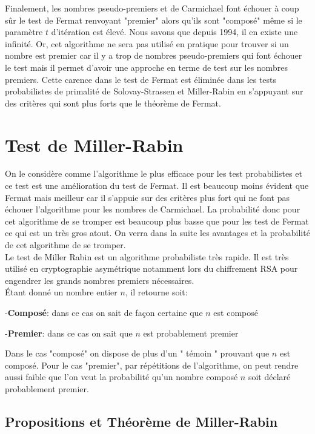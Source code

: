 Finalement, les nombres pseudo-premiers et  de Carmichael font échouer à coup sûr le test de Fermat renvoyant "premier" alors qu'ils sont "composé" même si le paramètre $t$ d'itération est élevé. Nous savons que depuis 1994, il en existe une infinité. Or, cet algorithme ne sera pas utilisé en pratique pour trouver si un nombre est premier car il y a trop de nombres pseudo-premiers qui font échouer le test mais il permet d'avoir une approche en terme de test sur les nombres premiers.
Cette carence dans le test de Fermat est éliminée dans les tests probabilistes de primalité de Solovay-Strassen et Miller-Rabin en s’appuyant sur des critères qui sont plus forts que le théorème de Fermat.


\section{Test de Miller-Rabin}

 On le considère comme l'algorithme le plus efficace pour les test probabilistes et ce test est une amélioration du test de Fermat. Il est beaucoup moins évident que Fermat mais meilleur car il s'appuie sur des critères plus fort qui ne font pas échouer l'algorithme pour les nombres de Carmichael. La probabilité donc pour cet algorithme de se tromper est beaucoup plus basse que pour les test de Fermat ce qui est un très gros atout. On verra dans la suite les avantages et la probabilité de cet algorithme de se tromper.\\
 Le test de Miller Rabin est un algorithme probabiliste très rapide. Il est très utilisé en cryptographie asymétrique notamment lors du chiffrement RSA pour engendrer les grands nombres premiers nécessaires.\\ Étant donné un nombre entier $n$, il retourne soit:

-\textbf{Composé}: dans ce cas on sait de façon certaine que $n$ est composé

-\textbf{Premier}: dans ce cas on sait que $n$ est probablement premier

Dans le cas "composé" on dispose de plus d’un " témoin " prouvant que $n$ est composé. Pour le cas "premier", par répétitions de l’algorithme, on peut rendre aussi faible que l’on veut la probabilité qu’un nombre composé $n$ soit déclaré probablement premier.
\clearpage

\subsection{Propositions et Théorème de Miller-Rabin} 

